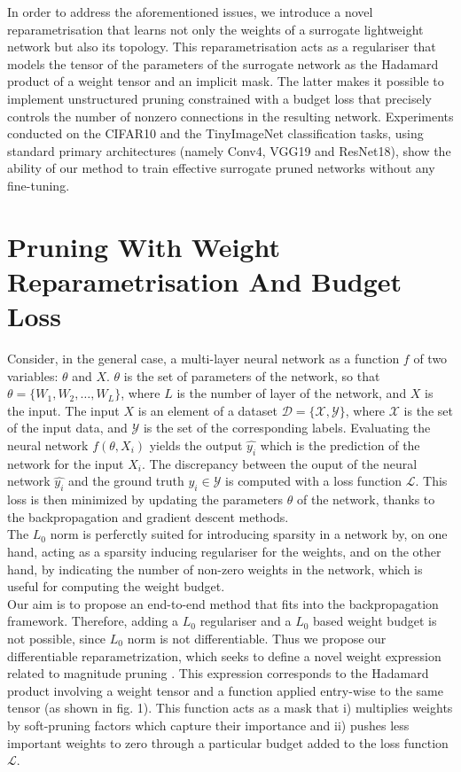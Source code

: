 In order to address the aforementioned issues, we introduce a novel
reparametrisation that learns not only the weights of a surrogate lightweight
network but also its topology. This reparametrisation acts as a regulariser that
models the tensor of the parameters of the surrogate network as the Hadamard
product of a weight tensor and an implicit mask. The latter makes it possible to
implement unstructured pruning constrained with a budget loss that precisely
controls the number of nonzero connections in the resulting network. Experiments
conducted on the CIFAR10 and the TinyImageNet classification tasks, using
standard primary architectures (namely Conv4, VGG19 and ResNet18), show the
ability of our method to train effective surrogate pruned networks without any
fine-tuning.

\section{Pruning With Weight Reparametrisation And Budget Loss}

Consider, in the general case, a multi-layer neural network as a function $f$ of
two variables: $\theta$ and $X$. $\theta$ is the set of parameters of the
network, so that $\theta = \{W_1, W_2, \ldots, W_L\}$, where $L$ is the number
of layer of the network,  and $X$ is the input. The input $X$ is an element of a
dataset $\mathcal{D}=\{ \mathcal{X}, \mathcal{Y} \}$, where $\mathcal{X}$ is the
set of the input data, and $\mathcal{Y}$ is the set of the corresponding labels.
Evaluating the neural network $f(\theta, X_i)$ yields the output $\hat{y_i}$
which is the prediction of the network for the input $X_i$. The discrepancy
between the ouput of the neural network $\hat{y_i}$ and the ground truth $y_i
\in \mathcal{Y}$ is computed with a loss function $\mathcal{L}$.  This loss is
then minimized by updating the parameters $\theta$ of the network, thanks to the
backpropagation \cite{rumelhart1985learning,rumelhart1986learning} and gradient
descent methods. \\

The $L_0$ norm is perferctly suited for introducing sparsity in a network by, on
one hand, acting as a sparsity inducing regulariser for the weights, and on the
other hand, by indicating the number of non-zero weights in the network, which
is useful for computing the weight budget. \\

Our aim is to propose an end-to-end method that fits into the backpropagation
framework. Therefore, adding a $L_0$ regulariser and a $L_0$ based weight budget
is not possible, since $L_0$ norm is not differentiable. Thus we propose our
differentiable reparametrization, which seeks to define a novel weight expression
related to magnitude pruning
\cite{DBLP:conf/nips/CunDS89,DBLP:conf/nips/HanPTD15}. This expression
corresponds to the Hadamard product involving a weight tensor and a function
applied entry-wise to the same tensor (as shown in fig. 1). This function acts
as a mask that i) multiplies weights by soft-pruning factors which capture their
importance and ii) pushes less important weights to zero through a particular
budget added to the loss function $\mathcal{L}$. \\

